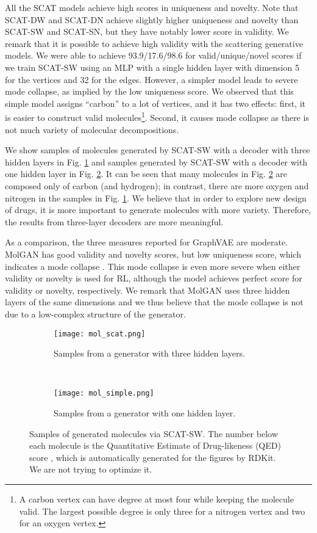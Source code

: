 \documentclass[conference]{IEEEtran}
\begin{document}
All the SCAT models achieve high scores in uniqueness and novelty. Note that SCAT-DW and SCAT-DN achieve slightly higher uniqueness and novelty than SCAT-SW and SCAT-SN, but they have notably lower score in validity. We remark that it is possible to achieve high validity with the scattering generative models. We were able to achieve 93.9/17.6/98.6 for valid/unique/novel scores if we train SCAT-SW using an MLP with a single hidden layer with dimension 5 for the vertices and 32 for the edges. However, a simpler model leads to severe mode collapse, as implied by the low uniqueness score. We observed that this simple model assigns ``carbon'' to a lot of vertices, and it has two effects: first, it is easier to construct valid molecules\footnote{A carbon vertex can have degree at most four while keeping the molecule valid. The largest possible degree is only three for a nitrogen vertex and two for an oxygen vertex.}. Second, it causes mode collapse as there is not much variety of molecular decompositions. 

We show samples of molecules generated by SCAT-SW with a decoder with three hidden layers in Fig. \ref{fig:molscat} and samples generated by SCAT-SW with a decoder with one hidden layer in Fig. \ref{fig:molsimple}. It can be seen that many molecules in Fig. \ref{fig:molsimple} are composed only of carbon (and hydrogen); in contrast, there are more oxygen and nitrogen in the samples in Fig. \ref{fig:molscat}. We believe that in order to explore new design of drugs, it is more important to generate molecules with more variety. Therefore, the results from three-layer decoders are more meaningful.


As a comparison, the three measures reported for GraphVAE are moderate. MolGAN has good validity and novelty scores, but low uniqueness score, which indicates a mode collapse \cite{de2018molgan}. This mode collapse is even more severe when either validity or novelty is used for RL, although the model achieves perfect score for validity or novelty, respectively. We remark that MolGAN uses three hidden layers of the same dimensions and we thus believe that the mode collapse is not due to a low-complex structure of the generator.

\begin{figure*}[ht]
  \centering
  \begin{subfigure}[b]{.48\linewidth}
    \centering\texttt{[image: mol\_scat.png]}
    \caption{Samples from a generator with three hidden layers. 
    \label{fig:molscat}}
  \end{subfigure}~
  \begin{subfigure}[b]{.48\linewidth}
    \centering\texttt{[image: mol\_simple.png]}
    \caption{Samples from a generator with one hidden layer.  
  \label{fig:molsimple}}
  \end{subfigure}
  \caption{Samples of generated molecules via SCAT-SW. The number below each molecule is the Quantitative Estimate of Drug-likeness (QED) score \cite{bickerton2012quantifying}, which is automatically generated for the figures by RDKit. We are not trying to optimize it.}
  \label{fig:molcpr}
\end{figure*}
\end{document}
